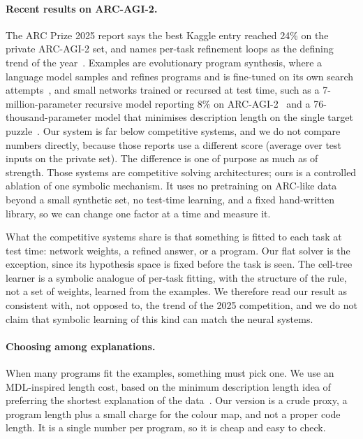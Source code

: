 \documentclass[sigconf,nonacm]{acmart}
\begin{document}
\paragraph{Recent results on ARC-AGI-2.} The ARC Prize 2025 report says the best Kaggle entry reached 24\% on the private ARC-AGI-2 set, and names per-task refinement loops as the defining trend of the year~\cite{chollet2025prize2025}. Examples are evolutionary program synthesis, where a language model samples and refines programs and is fine-tuned on its own search attempts~\cite{pourcel2025soar}, and small networks trained or recursed at test time, such as a 7-million-parameter recursive model reporting 8\% on ARC-AGI-2~\cite{jolicoeur2025trm} and a 76-thousand-parameter model that minimises description length on the single target puzzle~\cite{liao2025compressarc}. Our system is far below competitive systems, and we do not compare numbers directly, because those reports use a different score (average over test inputs on the private set). The difference is one of purpose as much as of strength. Those systems are competitive solving architectures; ours is a controlled ablation of one symbolic mechanism. It uses no pretraining on ARC-like data beyond a small synthetic set, no test-time learning, and a fixed hand-written library, so we can change one factor at a time and measure it.

What the competitive systems share is that something is fitted to each task at test time: network weights, a refined answer, or a program. Our flat solver is the exception, since its hypothesis space is fixed before the task is seen. The cell-tree learner is a symbolic analogue of per-task fitting, with the structure of the rule, not a set of weights, learned from the examples. We therefore read our result as consistent with, not opposed to, the trend of the 2025 competition, and we do not claim that symbolic learning of this kind can match the neural systems.

\paragraph{Choosing among explanations.} When many programs fit the examples, something must pick one. We use an MDL-inspired length cost, based on the minimum description length idea of preferring the shortest explanation of the data~\cite{rissanen1978mdl,grunwald2007mdl}. Our version is a crude proxy, a program length plus a small charge for the colour map, and not a proper code length. It is a single number per program, so it is cheap and easy to check.
\end{document}

